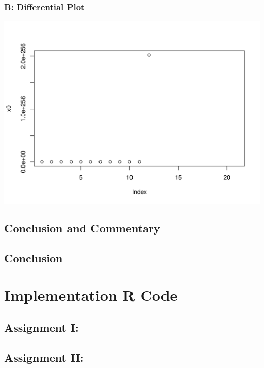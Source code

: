 \documentclass[12pt]{article}
\begin{document}
\subsubsection{B: Differential Plot}
\includegraphics[scale=0.6]{N.pdf}

\subsection{Conclusion and Commentary}

\subsection{Conclusion}

\newpage
\appendix
\section{Implementation R Code}
\subsection{Assignment I:}

\subsection{Assignment II: }

\end{document}
